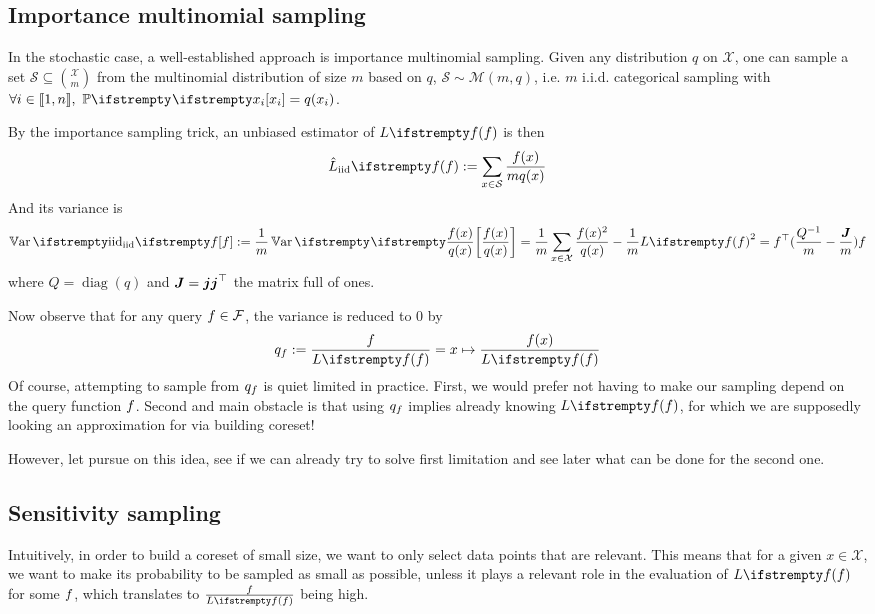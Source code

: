 \subsection{Importance multinomial sampling}

In the stochastic case, a well-established approach is importance multinomial sampling. Given any distribution $q$ on $\mathcal{X}$, one can sample a set $\mathcal{S} \subseteq \binom{\mathcal{X}}{m}$ from the multinomial distribution of size $m$ based on $q$, $\mathcal S \sim \mathcal M(m, q)$, i.e. $m$ i.i.d. categorical sampling with $\forall i \in \intint{1}{n},\ \PP{}{x_i} = q(x_i)$.

By the importance sampling trick, an unbiased estimator of $\loss{\query}$ is then
\begin{equation*}
	\estloss{\textrm{iid}}{\query} := \sum_{x\in \mathcal S} \frac{\query(x)}{m q(x)}
\end{equation*}
And its variance is
\begin{equation}
	\Var{\textrm{iid}}{\query} :=\frac{1}{m} \Var{}{\frac {\query(x)} {q(x)}}
	=\frac{1}{m} \sum_{x \in \mathcal{X}} \frac{\query(x)^{2}}{q(x)} -\frac{1}{m} \loss{\query}^{2} = \query\T(\frac{Q^{-1}} m - \frac{\moones} m)\query
\end{equation}
where $Q = \operatorname{diag}(q)$ and $\boldsymbol{J} = \boldsymbol{j} \boldsymbol{j} ^\top$ the matrix full of ones. 


Now observe that for any query $f \in \mathcal{F}$, the variance is reduced to 0 by
\begin{equation*}
    q_{\query} :=\frac{ \query}{\loss{\query}} = x \mapsto \frac{ \query(x)}{\loss{\query}}
\end{equation*}
Of course, attempting to sample from $q_f$ is quiet limited in practice. First, we would prefer not having to make our sampling depend on the query function $f$. Second and main obstacle is that using $q_f$ implies already knowing $\loss{\query}$, for which we are supposedly looking an approximation for via building coreset!

However, let pursue on this idea, see if we can already try to solve first limitation and see later what can be done for the second one.

\subsection{Sensitivity sampling}



Intuitively, in order to build a coreset of small size, we want to only select data points that are relevant. This means that for a given $x \in \mathcal{X}$, we want to make its probability to be sampled as small as possible, unless it plays a relevant role in the evaluation of $\loss{\query}$ for some $f$, which translates to $\frac{\query}{\loss{\query}}$ being high.

